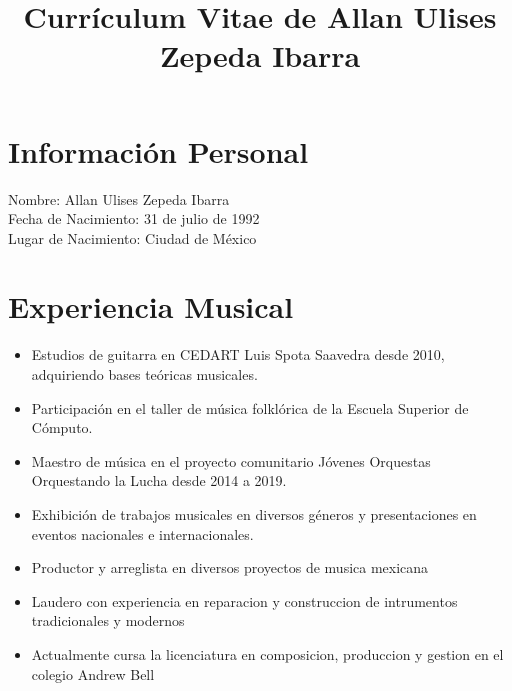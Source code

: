 \documentclass[a4paper,10pt]{article}
\title{Currículum Vitae de Allan Ulises Zepeda Ibarra}
\date{}
\begin{document}
\maketitle

\section*{Información Personal}
Nombre: Allan Ulises Zepeda Ibarra \\
Fecha de Nacimiento: 31 de julio de 1992 \\
Lugar de Nacimiento: Ciudad de México

\section*{Experiencia Musical}
\begin{itemize}[left=0pt]
    \item Estudios de guitarra en CEDART Luis Spota Saavedra desde 2010, adquiriendo bases teóricas musicales.
    \item Participación en el taller de música folklórica de la Escuela Superior de Cómputo.
    \item Maestro de música en el proyecto comunitario Jóvenes Orquestas Orquestando la Lucha desde 2014 a 2019.
    \item Exhibición de trabajos musicales en diversos géneros y presentaciones en eventos nacionales e internacionales.
    \item Productor y arreglista en diversos proyectos de musica mexicana
    \item Laudero con experiencia en reparacion y construccion de intrumentos tradicionales y modernos
    \item Actualmente cursa la licenciatura en composicion, produccion y gestion en el colegio Andrew Bell
\end{itemize}
\end{document}

